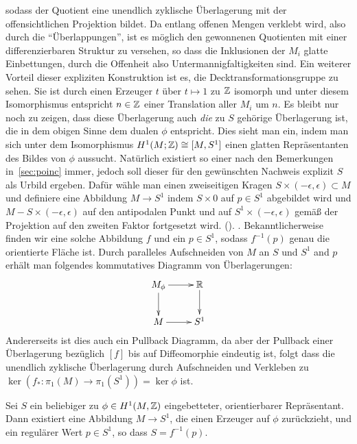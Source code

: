 \begin{constr}
	sodass der Quotient eine unendlich zyklische Überlagerung mit der offensichtlichen Projektion bildet. Da entlang offenen Mengen verklebt wird, also durch die "`Überlappungen"', ist es möglich den gewonnenen Quotienten mit einer differenzierbaren Struktur zu versehen, so dass die Inklusionen der $M_i$ glatte Einbettungen, durch die Offenheit also Untermannigfaltigkeiten sind. Ein weiterer Vorteil dieser expliziten Konstruktion ist es, die Decktransformationsgruppe zu sehen. Sie ist durch einen Erzeuger $t$ über $t\mapsto 1$ zu $\mathbb{Z}$ isomorph und unter diesem Isomorphismus entspricht $n\in \mathbb{Z}$ einer Translation aller $M_i$ um $n$. Es bleibt nur noch zu zeigen, dass diese Überlagerung auch \textit{die} zu $S$ gehörige Überlagerung ist, die in dem obigen Sinne dem dualen $\phi$ entspricht. Dies sieht man ein, indem man sich unter dem Isomorphismus $H^1(M;\mathbb{Z})\cong [M,S^1]$ einen glatten Repräsentanten des Bildes von $\phi$ aussucht. Natürlich existiert so einer nach den Bemerkungen in~\ref{sec:poinc} immer, jedoch soll dieser für den gewünschten Nachweis explizit $S$ als Urbild ergeben. Dafür wähle man einen zweiseitigen Kragen $S\times (-\epsilon,\epsilon) \subset M$ und definiere eine Abbildung $M\to S^1$ indem $S\times 0$ auf $p\in S^1$ abgebildet wird und $M-S \times (-\epsilon,\epsilon)$ auf den antipodalen Punkt und auf $S^1\times (-\epsilon,\epsilon)$ gemäß der Projektion auf den zweiten Faktor fortgesetzt wird. (). . Bekanntlicherweise finden wir eine solche Abbildung $f$ und ein $p \in S^1$, sodass $f^{-1}(p)$ genau die orientierte Fläche ist. Durch paralleles Aufschneiden von $M$ an $S$ und $S^1$ and $p$ erhält man folgendes kommutatives Diagramm von Überlagerungen:
	\[
		\begin{xy}
			\xymatrix{M_\phi \ar[r] \ar[d] &\RR \ar[d]\\
						M \ar[r]& S^1}
		\end{xy}
	\]
	Andererseits ist dies auch ein Pullback Diagramm, da aber der Pullback einer Überlagerung bezüglich $[f]$ bis auf Diffeomorphie eindeutig ist, folgt dass die unendlich zyklische Überlagerung durch Aufschneiden und Verkleben zu $\ker(f_*:\pi_1(M)\to\pi_1(S^1)) = \ker\phi$ ist.
\end{constr}

\begin{constr}
	\label{constr:presurf}
	Sei $S$ ein beliebiger zu $\phi \in H^1(M,\mathbb{Z})$ eingebetteter, orientierbarer Repräsentant. Dann existiert eine Abbildung $M \to S^1$, die einen Erzeuger auf $\phi$ zurückzieht, und ein regulärer Wert $p \in S^1$, so dass $S=f^{-1}(p)$. 
\end{constr}

